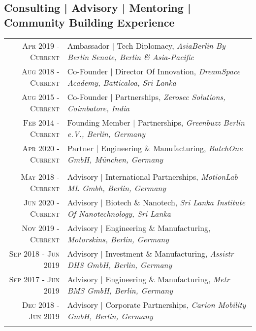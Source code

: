 \subsection{Consulting | Advisory | Mentoring | Community Building Experience}
\begin{longtable}
	{r|p{13cm}}
	\textsc{Apr 2019 - Current} & Ambassador | Tech Diplomacy, \emph{AsiaBerlin By Berlin Senate, Berlin \& Asia-Pacific}\\
	\textsc{Aug 2018 - Current} & Co-Founder | Director Of Innovation, \emph{DreamSpace Academy, Batticaloa, Sri Lanka}\\
	\textsc{Aug 2015 - Current} & Co-Founder | Partnerships, \emph{Zerosec Solutions, Coimbatore, India}\\
	\textsc{Feb 2014 - Current} & Founding Member | Partnerships, \emph{Greenbuzz Berlin e.V., Berlin, Germany}\\
	\textsc{Apr 2020 - Current} & Partner | Engineering \& Manufacturing, \emph{BatchOne GmbH, München, Germany}\\

	\multicolumn{2}{c}{} \\

	\textsc{May 2018 - Current} & Advisory | International Partnerships, \emph{MotionLab ML Gmbh, Berlin, Germany}\\
	\textsc{Jun 2020 - Current} & Advisory | Biotech \& Nanotech, \emph{Sri Lanka Institute Of Nanotechnology, Sri Lanka}\\
	\textsc{Nov 2019 - Current} & Advisory | Engineering \& Manufacturing, \emph{Motorskins, Berlin, Germany}\\
	\textsc{Sep 2018 - Jun 2019} & Advisory | Investment \& Manufacturing, \emph{Assistr DHS GmbH, Berlin, Germany}\\
	\textsc{Sep 2017 - Jun 2019} & Advisory | Engineering \& Manufacturing, \emph{Metr BMS GmbH, Berlin, Germany}\\
	\textsc{Dec 2018 - Jun 2019} & Advisory | Corporate Partnerships, \emph{Carion Mobility GmbH, Berlin, Germany}\\

	\multicolumn{2}{c}{} \\


\end{longtable}
